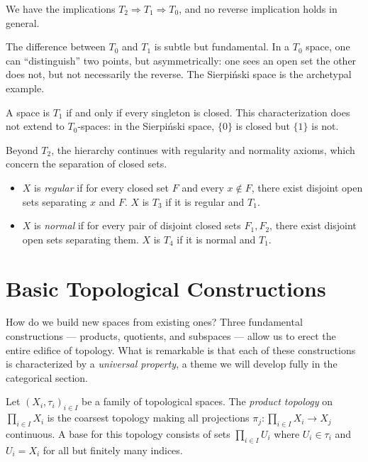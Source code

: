 \begin{proposition}
We have the implications $T_2 \Rightarrow T_1 \Rightarrow T_0$, and no reverse
implication holds in general.
\end{proposition}

The difference between $T_0$ and $T_1$ is subtle but fundamental. In a
$T_0$ space, one can ``distinguish'' two points, but asymmetrically: one
sees an open set the other does not, but not necessarily the reverse. The
Sierpi\'nski space is the archetypal example.

\begin{remark}
A space is $T_1$ if and only if every singleton is closed. This characterization does not
extend to $T_0$-spaces: in the Sierpi\'nski space, $\{0\}$ is closed but $\{1\}$ is not.
\end{remark}

Beyond $T_2$, the hierarchy continues with regularity and normality axioms,
which concern the separation of closed sets.

\begin{definition}
\begin{itemize}
  \item $X$ is \emph{regular} if for every closed set $F$ and every $x \notin F$, there
    exist disjoint open sets separating $x$ and $F$. $X$ is \emph{$T_3$} if it is regular
    and $T_1$.
  \item $X$ is \emph{normal} if for every pair of disjoint closed sets $F_1, F_2$, there
    exist disjoint open sets separating them. $X$ is \emph{$T_4$} if it is normal and $T_1$.
\end{itemize}
\end{definition}

\section{Basic Topological Constructions}

How do we build new spaces from existing ones? Three fundamental
constructions --- products, quotients, and subspaces --- allow us to erect
the entire edifice of topology. What is remarkable is that each of these
constructions is characterized by a \emph{universal property}, a theme we
will develop fully in the categorical section.

\begin{definition}
Let $(X_i,\tau_i)_{i\in I}$ be a family of topological spaces. The \emph{product topology}
on $\prod_{i\in I} X_i$ is the coarsest topology making all projections
$\pi_j\colon \prod_{i\in I} X_i \to X_j$ continuous. A base for this topology consists of
sets $\prod_{i\in I} U_i$ where $U_i \in \tau_i$ and $U_i = X_i$ for all but finitely
many indices.
\end{definition}

